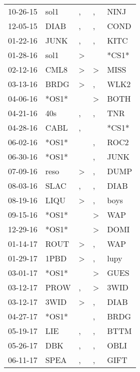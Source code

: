 \begin{supertabular}{lllll}
 10-26-15 &   sol1 &                , &             , &   NINJ \\
 12-05-15 &   DIAB &                , &             , &   COND \\
 01-22-16 &   JUNK &                , &             , &   KITC \\
 01-28-16 &   sol1 &     \textgreater &               &  *CS1* \\
 02-12-16 &   CML8 &     \textgreater &  \textgreater &   MISS \\
 03-13-16 &   BRDG &     \textgreater &             , &   WLK2 \\
 04-06-16 &  *OS1* &                  &  \textgreater &   BOTH \\
 04-21-16 &    40s &                , &             , &    TNR \\
 04-28-16 &   CABL &                , &               &  *CS1* \\
 06-02-16 &  *OS1* &                  &             , &   ROC2 \\
 06-30-16 &  *OS1* &                  &             , &   JUNK \\
 07-09-16 &   reso &     \textgreater &             , &   DUMP \\
 08-03-16 &   SLAC &                , &             , &   DIAB \\
 08-19-16 &   LIQU &     \textgreater &             , &   boys \\
 09-15-16 &  *OS1* &                  &  \textgreater &    WAP \\
 12-29-16 &  *OS1* &                  &  \textgreater &   DOMI \\
 01-14-17 &   ROUT &     \textgreater &             , &    WAP \\
 01-29-17 &   1PBD &     \textgreater &             , &   lupy \\
 03-01-17 &  *OS1* &                  &  \textgreater &   GUES \\
 03-12-17 &   PROW &                , &  \textgreater &   3WID \\
 03-12-17 &   3WID &     \textgreater &             , &   DIAB \\
 04-27-17 &  *OS1* &                  &             , &   BRDG \\
 05-19-17 &    LIE &                , &             , &   BTTM \\
 05-26-17 &    DBK &                , &             , &   OBLI \\
 06-11-17 &   SPEA &                , &             , &   GIFT \\

\end{supertabular}
